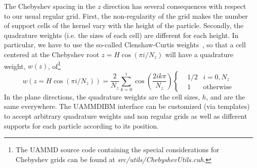 \documentclass[twoside,openright,titlepage,numbers=noenddot,%
headinclude,footinclude,cleardoublepage=empty,abstract=on,
BCOR=5mm,fontsize=11pt, dvipsnames, paper=b5
]{scrreprt}
\newcommand{\uammd}{\gls{UAMMD}\xspace}
\begin{document}
The Chebyshev spacing in the $z$ direction has several consequences with respect to our usual regular grid. First, the non-regularity of the grid makes the number of support cells of the kernel vary with the height of the particle. Secondly, the quadrature weights (i.e. the sizes of each cell) are different for each height. In particular, we have to use the so-called Clenshaw-Curtis weights~\cite{Clenshaw1960}, so that a cell centered at the Chebyshev root $z = H\cos(\pi i/N_z)$ will have a quadrature weight, $w(z)$, of\footnote{The \uammd source code containing the special considerations for Chebyshev grids can be found at \emph{src/utils/ChebyshevUtils.cuh}.}
\begin{equation}
  \label{eq:clencurt}
  w(z=H\cos(\pi i/N_z)) = \frac{2}{N_z}\sum_{k=0}^i\cos\left(\frac{2ik\pi}{N_z}\right)\left\{
  \begin{aligned}
    &1/2 & i=0,N_z\\
    & 1 & \textrm{otherwise}
  \end{aligned}\right.
\end{equation}
In the plane directions, the quadrature weights are the cell sizes, $h$, and are the same everywhere.
The \uammd \gls{IBM} interface can be customized (via templates) to accept arbitrary quadrature weights and non regular grids as well as different supports for each particle according to its position.
\end{document}
